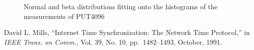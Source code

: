 \documentclass[10pt]{article}
\begin{document}
\begin{figure}[H]
	\centering
	\caption{Normal and beta distributions fitting onto the histograms of the measurements of PUT4096~\label{fig:extra_pt_hist7}}
\end{figure}


\newcommand{\etalchar}[1]{$^{#1}$}
\begin{thebibliography}{99}
 David L. Mills, ``Internet Time Synchronization: The Network Time Protocol,'' in {\it IEEE Trans. on Comm.}, Vol. 39, No. 10, pp.~1482--1493, October, 1991.
\end{thebibliography}
\end{document}
